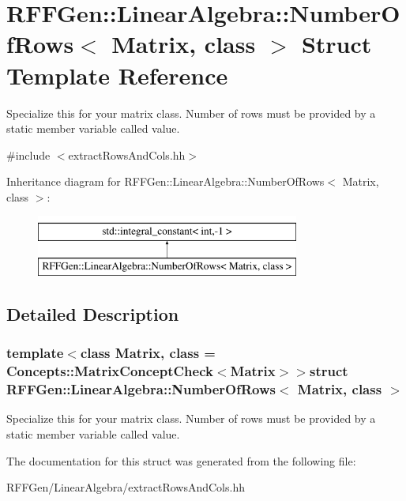 \hypertarget{structRFFGen_1_1LinearAlgebra_1_1NumberOfRows}{\section{R\-F\-F\-Gen\-:\-:Linear\-Algebra\-:\-:Number\-Of\-Rows$<$ Matrix, class $>$ Struct Template Reference}
\label{structRFFGen_1_1LinearAlgebra_1_1NumberOfRows}
}


Specialize this for your matrix class. Number of rows must be provided by a static member variable called value.  




{\ttfamily \#include $<$extract\-Rows\-And\-Cols.\-hh$>$}

Inheritance diagram for R\-F\-F\-Gen\-:\-:Linear\-Algebra\-:\-:Number\-Of\-Rows$<$ Matrix, class $>$\-:\begin{figure}[H]
\begin{center}
\leavevmode
\includegraphics[height=2.000000cm]{structRFFGen_1_1LinearAlgebra_1_1NumberOfRows}
\end{center}
\end{figure}


\subsection{Detailed Description}
\subsubsection*{template$<$class Matrix, class = Concepts\-::\-Matrix\-Concept\-Check$<$\-Matrix$>$$>$struct R\-F\-F\-Gen\-::\-Linear\-Algebra\-::\-Number\-Of\-Rows$<$ Matrix, class $>$}

Specialize this for your matrix class. Number of rows must be provided by a static member variable called value. 

The documentation for this struct was generated from the following file\-:\begin{DoxyCompactItemize}
\item 
R\-F\-F\-Gen/\-Linear\-Algebra/extract\-Rows\-And\-Cols.\-hh\end{DoxyCompactItemize}
